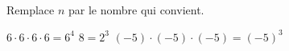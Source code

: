 %
%
Remplace $n$ par le nombre qui convient.
	\begin{tasks}
		\task $6\cdot 6 \cdot 6 \cdot 6 = 6^4$
		\task $8=2^3$
		\task $(-5)\cdot(-5)\cdot(-5) = (-5)^3$
	\end{tasks}
